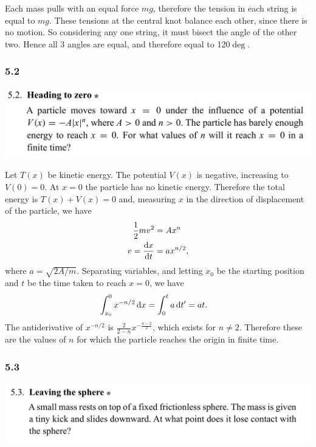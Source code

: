 Each mass pulls with an equal force $mg$, therefore the tension in each string is equal to
$mg$. These tensions at the central knot balance each other, since there is no motion. So
considering any one string, it must bisect the angle of the other two. Hence all 3 angles are equal,
and therefore equal to 120$\deg$.

\subsubsection*{5.2}
\begin{mdframed}
  \includegraphics[width=400pt]{img/physics--classical-mechanics--morin--5-2.png}
\end{mdframed}

Let $T(x)$ be kinetic energy. The potential $V(x)$ is negative, increasing to $V(0) = 0$. At $x = 0$
the particle has no kinetic energy. Therefore the total energy is $T(x) + V(x) = 0$ and, measuring
$x$ in the direction of displacement of the particle, we have
\begin{align*}
  \frac{1}{2}mv^2 &= Ax^n \\
  v = \dxdt       &= a x^{n/2},
\end{align*}
where $a = \sqrt{2A/m}$. Separating variables, and letting $x_0$ be the starting position and $t$ be
the time taken to reach $x=0$, we have
\begin{align*}
  \int_{x_0}^0 x^{-n/2} \dx &= \int_0^t a\dt' = at.
\end{align*}
The antiderivative of $x^{-n/2}$ is $\frac{2}{2 - n}x^{-\frac{n - 2}{2}}$, which exists for
$n \neq 2$. Therefore these are the values of $n$ for which the particle reaches the origin in
finite time.

\subsubsection*{5.3}
\begin{mdframed}
  \includegraphics[width=400pt]{img/physics--classical-mechanics--morin--5-3.png}
\end{mdframed}

